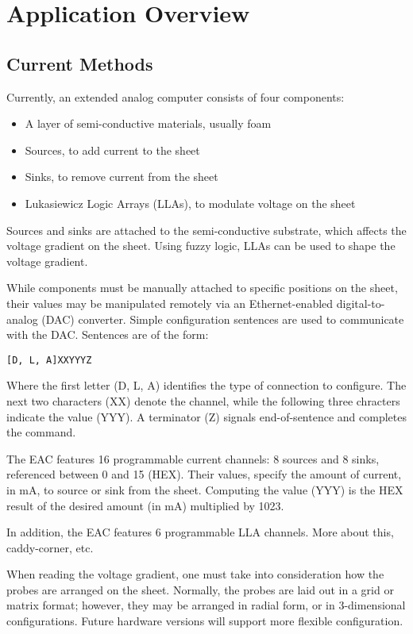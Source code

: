 \chapter{Application Overview}

\section{Current Methods}

Currently, an extended analog computer consists of four components:
\begin{itemize}
	\item A layer of semi-conductive materials, usually foam
	\item Sources, to add current to the sheet
	\item Sinks, to remove current from the sheet
	\item Lukasiewicz Logic Arrays (LLAs), to modulate voltage on the sheet
\end{itemize}

Sources and sinks are attached to the semi-conductive substrate, which affects the voltage gradient on the sheet.  Using fuzzy logic, LLAs can be used to shape the voltage gradient.

While components must be manually attached to specific positions on the sheet, their values may be manipulated remotely via an Ethernet-enabled digital-to-analog (DAC) converter.  Simple configuration sentences are used to communicate with the DAC.  Sentences are of the form:

\begin{verbatim}
[D, L, A]XXYYYZ
\end{verbatim}

Where the first letter (D, L, A) identifies the type of connection to configure.  The next two characters (XX) denote the channel, while the following three chracters indicate the value (YYY).  A terminator (Z) signals end-of-sentence and completes the command.

The EAC features 16 programmable current channels: 8 sources and 8 sinks, referenced between 0 and 15 (HEX).  Their values, specify the amount of current, in mA, to source or sink from the sheet.  Computing the value (YYY) is the HEX result of the desired amount (in mA) multiplied by 1023.

In addition, the EAC features 6 programmable LLA channels.  More about this, caddy-corner, etc.

When reading the voltage gradient, one must take into consideration how the probes are arranged on the sheet.  Normally, the probes are laid out in a grid or matrix format; however, they may be arranged in radial form, or in 3-dimensional configurations.  Future hardware versions will support more flexible configuration.

